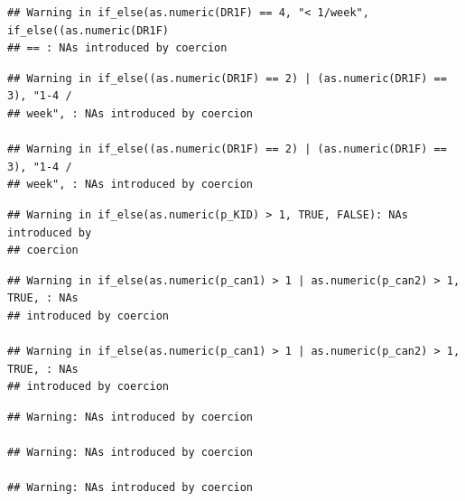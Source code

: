 \documentclass[]{article}
\newenvironment{Shaded}{\begin{snugshade}}{\end{snugshade}}
\newcommand{\DataTypeTok}[1]{\textcolor[rgb]{0.13,0.29,0.53}{#1}}
\newcommand{\DecValTok}[1]{\textcolor[rgb]{0.00,0.00,0.81}{#1}}
\newcommand{\KeywordTok}[1]{\textcolor[rgb]{0.13,0.29,0.53}{\textbf{#1}}}
\newcommand{\NormalTok}[1]{#1}
\newcommand{\OperatorTok}[1]{\textcolor[rgb]{0.81,0.36,0.00}{\textbf{#1}}}
\newcommand{\OtherTok}[1]{\textcolor[rgb]{0.56,0.35,0.01}{#1}}
\newcommand{\StringTok}[1]{\textcolor[rgb]{0.31,0.60,0.02}{#1}}
\begin{document}
\begin{verbatim}
## Warning in if_else(as.numeric(DR1F) == 4, "< 1/week", if_else((as.numeric(DR1F)
## == : NAs introduced by coercion
\end{verbatim}

\begin{verbatim}
## Warning in if_else((as.numeric(DR1F) == 2) | (as.numeric(DR1F) == 3), "1-4 /
## week", : NAs introduced by coercion

## Warning in if_else((as.numeric(DR1F) == 2) | (as.numeric(DR1F) == 3), "1-4 /
## week", : NAs introduced by coercion
\end{verbatim}

\begin{verbatim}
## Warning in if_else(as.numeric(p_KID) > 1, TRUE, FALSE): NAs introduced by
## coercion
\end{verbatim}

\begin{verbatim}
## Warning in if_else(as.numeric(p_can1) > 1 | as.numeric(p_can2) > 1, TRUE, : NAs
## introduced by coercion

## Warning in if_else(as.numeric(p_can1) > 1 | as.numeric(p_can2) > 1, TRUE, : NAs
## introduced by coercion
\end{verbatim}

\begin{verbatim}
## Warning: NAs introduced by coercion

## Warning: NAs introduced by coercion

## Warning: NAs introduced by coercion
\end{verbatim}

\begin{Shaded}
\end{Shaded}
\end{document}
